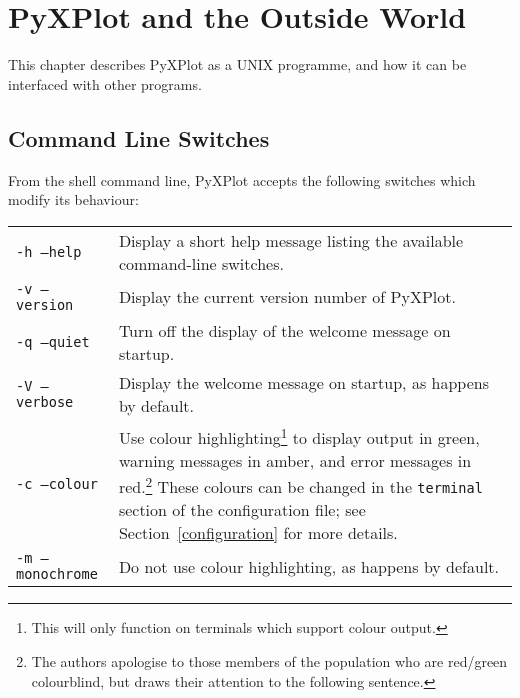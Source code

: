 %
%
%
%
%



\chapter{PyXPlot and the Outside World}
\label{gnuplot_ext_first}

This chapter describes PyXPlot as a UNIX programme, and how it can be interfaced
with other programs. 

\section{Command Line Switches}

From the shell command line, PyXPlot accepts the following switches which
modify its behaviour:

\begin{longtable}{p{3.5cm}p{8.5cm}}
{\tt -h --help} & Display a short help message listing the available command-line switches.\\
{\tt -v --version} & Display the current version number of PyXPlot.\\
{\tt -q --quiet} & Turn off the display of the welcome message on startup. \\
{\tt -V --verbose} & Display the welcome message on startup, as happens by default. \\
{\tt -c --colour} & Use colour highlighting\footnote{This will only function on terminals which support colour output.} to display output in green, warning messages in amber, and error messages in red.\footnote{The authors apologise to those members of the population who are red/green colourblind, but draws their attention to the following sentence.} These colours can be changed in the {\tt terminal} section of the configuration file; see Section~\ref{configuration} for more details. \\
{\tt -m --monochrome} & Do not use colour highlighting, as happens by default. \\
\end{longtable}

